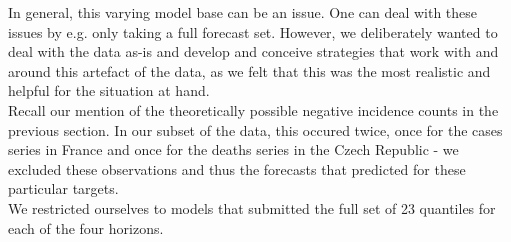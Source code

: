 In general, this varying model base can be an issue. One can deal with these issues by e.g. only taking a full forecast set. However, we deliberately wanted to deal with the data as-is and develop and conceive strategies that work with and around this artefact of the data, as we felt that this was the most realistic and helpful for the situation at hand. \\
Recall our mention of the theoretically possible negative incidence counts in the previous section. In our subset of the data, this occured twice, once for the cases series in France and once for the deaths series in the Czech Republic - we excluded these observations and thus the forecasts that predicted for these particular targets.\\
We restricted ourselves to models that submitted the full set of 23 quantiles for each of the four horizons.\\
